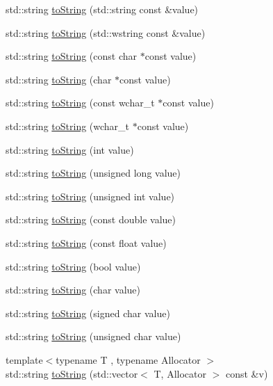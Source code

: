\begin{DoxyCompactItemize}
std\-::string \hyperlink{namespaceCatch_ad6e969257437cf007b8b5017b22e570c}{to\-String} (std\-::string const \&value)
\item 
std\-::string \hyperlink{namespaceCatch_af9fc40701e3a7d0790866e7cf8c0279f}{to\-String} (std\-::wstring const \&value)
\item 
std\-::string \hyperlink{namespaceCatch_ace2e2fe33b196bc8278f605dcb72e38d}{to\-String} (const char $\ast$const value)
\item 
std\-::string \hyperlink{namespaceCatch_ae6c2bc95517444d8df8199bd3f61609b}{to\-String} (char $\ast$const value)
\item 
std\-::string \hyperlink{namespaceCatch_afa173b4639c682c9d8c20fae0939693c}{to\-String} (const wchar\-\_\-t $\ast$const value)
\item 
std\-::string \hyperlink{namespaceCatch_aa39121565abe9f30fce5d48e4e094768}{to\-String} (wchar\-\_\-t $\ast$const value)
\item 
std\-::string \hyperlink{namespaceCatch_acee54d0580385e4347bc42a7d22bc893}{to\-String} (int value)
\item 
std\-::string \hyperlink{namespaceCatch_aba1d78bce62f8c73cbfc2a14225356ea}{to\-String} (unsigned long value)
\item 
std\-::string \hyperlink{namespaceCatch_a6fd78030f740c1c3bdc60efdfd5fc85d}{to\-String} (unsigned int value)
\item 
std\-::string \hyperlink{namespaceCatch_a3eb4356d09b7ef3286f6c1c1efe8cabf}{to\-String} (const double value)
\item 
std\-::string \hyperlink{namespaceCatch_a80b6411e2cba89e58aa8feb960d045d5}{to\-String} (const float value)
\item 
std\-::string \hyperlink{namespaceCatch_a5d3bdb2ec0e6f415e2a1a0e4914d7d3a}{to\-String} (bool value)
\item 
std\-::string \hyperlink{namespaceCatch_a25a0a78cbb62ea08b5d49e443051c387}{to\-String} (char value)
\item 
std\-::string \hyperlink{namespaceCatch_a0a5d9d0965d0d2a0663773732283713e}{to\-String} (signed char value)
\item 
std\-::string \hyperlink{namespaceCatch_a5d83eaeb68579a556c86cc05f7a7765f}{to\-String} (unsigned char value)
\item 
{\footnotesize template$<$typename T , typename Allocator $>$ }\\std\-::string \hyperlink{namespaceCatch_a2899237fef39daaae9a22e7846c0a9bf}{to\-String} (std\-::vector$<$ T, Allocator $>$ const \&v)

\end{DoxyCompactItemize}
